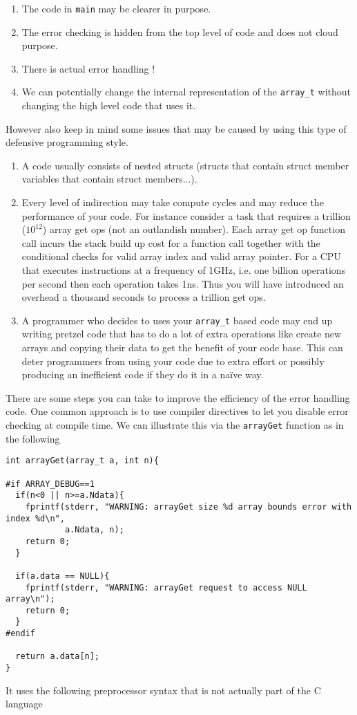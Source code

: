 \begin{enumerate}
    \item The code in \texttt{main} may be clearer in purpose.
    \item The error checking is hidden from the top level of code and does not cloud  purpose.
    \item There is actual error handling !
    \item We can potentially change the internal representation of the \texttt{array\_t} without changing the high level code that uses it.
\end{enumerate}
However also keep in mind some issues that may be caused by using this type of defensive programming style.
\begin{enumerate}
    \item A code usually consists of nested structs (structs that contain struct member variables that contain struct members...). 
    \item Every level of indirection may take compute cycles and may reduce the performance of your code. For instance consider a task that requires a trillion ($10^{12}$) array get ops (not an outlandish number). Each array get op function call incurs the stack build up cost for a function call together with the conditional checks for valid array index and valid array pointer. For a CPU that executes instructions at a frequency of 1GHz, i.e. one billion operations per second then each operation takes 1ns. Thus  you will have introduced an overhead a thousand seconds to process a trillion get ops.
    \item A programmer who decides to uses your \texttt{array\_t} based code may end up writing pretzel code that has to do a lot of extra operations like create new arrays and copying their data to get the benefit of your code base. This can deter programmers from using your code due to extra effort or possibly producing an inefficient code if they do it in a na\"{i}ve way.
\end{enumerate}
There are some steps you can take to improve the efficiency of the error handling code. One common approach is to use compiler directives to let you disable error checking at compile time. We can illustrate this via the \texttt{arrayGet} function as in the following

\begin{verbatim}
int arrayGet(array_t a, int n){

#if ARRAY_DEBUG==1
  if(n<0 || n>=a.Ndata){
    fprintf(stderr, "WARNING: arrayGet size %d array bounds error with index %d\n",
            a.Ndata, n);
    return 0;
  }

  if(a.data == NULL){
    fprintf(stderr, "WARNING: arrayGet request to access NULL array\n");
    return 0;
  }
#endif

  return a.data[n];
}
\end{verbatim}
It uses the following preprocessor syntax that is not actually part of the C language

